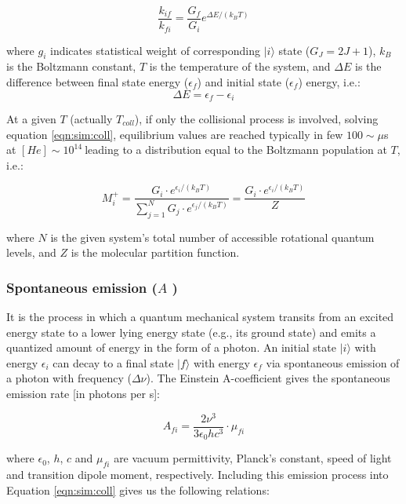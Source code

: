 \begin{equation}
    \frac{k_{if}}{k_{fi}} = \frac{G_f}{G_i} e^{\Delta E / \left(k_B T \right)}
\end{equation}

where $g_i$ indicates statistical weight of corresponding $|i\rangle$ state ($G_J = 2J + 1$), $k_B$ is the Boltzmann constant, $T$ is the temperature of the system, and $\Delta E$ is the difference between final state energy ($\epsilon _f$) and initial state ($\epsilon _f$) energy, i.e.:
\[ \Delta E = \epsilon_f - \epsilon_i \]

At a given $T$ (actually $T_{coll}$), if only the collisional process is involved, solving equation \ref{eqn:sim:coll}, equilibrium values are reached typically in few $100 \sim\mu$s at $[He]\sim 10^{14}\ $\percc leading to a distribution equal to the Boltzmann population at $T$, i.e.:

\begin{equation}
    M^+_i = \frac
        {G_i \cdot e^{\epsilon_i / \left(k_B T \right)}}
        {\sum_{j=1}^{N} G_j \cdot e^{\epsilon_j / \left(k_B T \right)}}
        = \frac{{G_i \cdot e^{\epsilon_i / \left(k_B T \right)}}}{Z}
\end{equation}

where $N$ is the given system's total number of accessible rotational quantum levels, and $Z$ is the molecular partition function.\\ 

\subsubsection{Spontaneous emission (\texorpdfstring{$A$}{A} )}
\label{subsec:ROSAA-simulation-spont}

It is the process in which a quantum mechanical system transits from an excited energy state to a lower lying energy state (e.g., its ground state) and emits a quantized amount of energy in the form of a photon. An initial state $|i\rangle$ with energy $\epsilon_i$ can decay to a final state $|f\rangle$ with energy $\epsilon_f$ via spontaneous emission of a photon with frequency ($\Delta \nu$). The Einstein A-coefficient gives the spontaneous emission rate [in photons per s]:

\[ A_{fi} = \frac{2\nu^3}{3\epsilon _0 h c^3} \cdot \mu _{fi}\]

where $\epsilon _0$, $h$, $c$ and $\mu _{fi}$ are vacuum permittivity, Planck's constant, speed of light and transition dipole moment, respectively. Including this emission process into Equation \ref{eqn:sim:coll} gives us the following relations:


